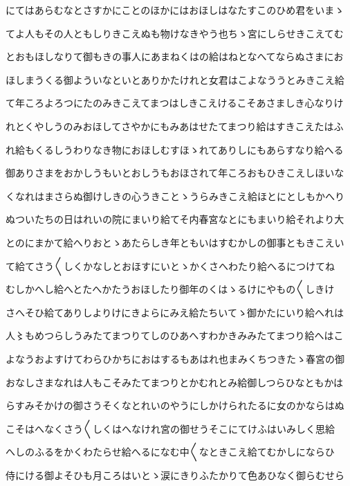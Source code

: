 \documentclass[a4paper,11pt,landscape]{ltjtarticle}
\begin{document}
\par\medskip
にてはあらむなとさすかにことのほかにはおほしはなたすこのひめ君をいまゝ
\par\medskip
てよ人もその人ともしりきこえぬも物けなきやう也ちゝ宮にしらせきこえてむ
\par\medskip
とおもほしなりて御もきの事人にあまねくはの給はねとなへてならぬさまにお
\par\medskip
ほしまうくる御よういなといとありかたけれと女君はこよなううとみきこえ給
\par\medskip
て年ころよろつにたのみきこえてまつはしきこえけるこそあさましき心なりけ
\par\medskip
れとくやしうのみおほしてさやかにもみあはせたてまつり給はすきこえたはふ
\par\medskip
れ給もくるしうわりなき物におほしむすほゝれてありしにもあらすなり給へる
\par\medskip
御ありさまをおかしうもいとおしうもおほされて年ころおもひきこえしほいな
\par\medskip
くなれはまさらぬ御けしきの心うきことゝうらみきこえ給ほとにとしもかへり
\par\medskip
ぬついたちの日はれいの院にまいり給てそ内春宮なとにもまいり給それより大
\par\medskip
とのにまかて給へりおとゝあたらしき年ともいはすむかしの御事ともきこえい
\par\medskip
て給てさう〱しくかなしとおほすにいとゝかくさへわたり給へるにつけてね
\par\medskip
むしかへし給へとたへかたうおほしたり御年のくはゝるけにやもの〱しきけ
\par\medskip
さへそひ給てありしよりけにきよらにみえ給たちいてゝ御かたにいり給へれは
\par\medskip
人〻もめつらしうみたてまつりてしのひあへすわかきみみたてまつり給へはこ
\par\medskip
よなうおよすけてわらひかちにおはするもあはれ也まみくちつきたゝ春宮の御
\par\medskip
おなしさまなれは人もこそみたてまつりとかむれとみ給御しつらひなともかは
\par\medskip
らすみそかけの御さうそくなとれいのやうにしかけられたるに女のかならはぬ
\par\medskip
こそはへなくさう〱しくはへなけれ宮の御せうそこにてけふはいみしく思給
\par\medskip
へしのふるをかくわたらせ給へるになむ中〱なときこえ給てむかしにならひ
\par\medskip
侍にける御よそひも月ころはいとゝ涙にきりふたかりて色あひなく御らむせら
\par\medskip
\end{document}
